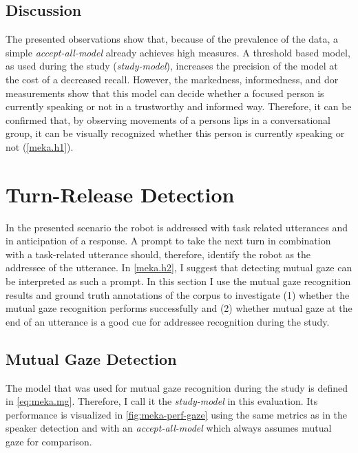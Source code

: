 \subsection{Discussion}

The presented observations show that, because of the \gls{prevalence} of the data, a simple \emph{accept-all-model} already achieves high measures.
A threshold based model, as used during the study (\emph{study-model}), increases the \gls{precision} of the model at the cost of a decreased \gls{recall}.
However, the \gls{markedness}, \gls{informedness}, and \gls{dor} measurements show that this model can decide whether a focused person is currently speaking or not in a trustworthy and informed way.
Therefore, it can be confirmed that, by observing movements of a persons lips in a \gls{conversational group}, it can be visually recognized whether this person is currently speaking or not (\cref{meka.h1}).

\section{Turn-Release Detection}\label{sec:meka.h2}

In the presented scenario the \gls{robot} is addressed with task related utterances and in anticipation of a response.
A prompt to take the next \gls{turn} in combination with a task-related utterance should, therefore, identify the \gls{robot} as the \gls{addressee} of the utterance.
In \cref{meka.h2}, I suggest that detecting mutual gaze can be interpreted as such a prompt.
In this section I use the mutual gaze recognition results and ground truth annotations of the corpus to investigate (1) whether the mutual gaze recognition performs successfully and (2) whether mutual gaze at the end of an utterance is a good cue for \gls{addressee} recognition during the study.

\subsection{Mutual Gaze Detection}

The model that was used for mutual gaze recognition during the study is defined in \cref{eq:meka.mg}.
Therefore, I call it the \emph{study-model} in this evaluation.
Its performance is visualized in \cref{fig:meka-perf-gaze} using the same metrics as in the \gls{speaker} detection and with an \emph{accept-all-model} which always assumes mutual gaze for comparison.

